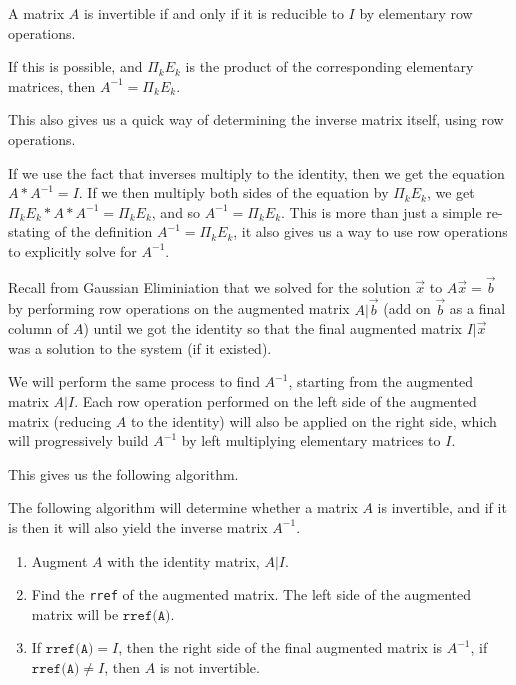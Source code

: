 \documentclass{ximera}
\begin{document}
\begin{theorem}\label{th:prod-elementary}
  A matrix $A$ is invertible if and
  only if it is reducible to $I$ by elementary row operations.

  If this is possible, and $\Pi_kE_k$ is the product of the corresponding elementary matrices, then $A^{-1}=\Pi_kE_k$.
\end{theorem}

This also gives us a quick way of determining the inverse matrix itself, using row operations.

\begin{remark}
  If we use the fact that inverses multiply to the identity, then we get the equation $A*A^{-1}=I$. If we then multiply both sides of the equation by $\Pi_kE_k$, we get $\Pi_kE_k*A*A^{-1}=\Pi_kE_k$, and so $A^{-1}=\Pi_kE_k$. This is more than just a simple re-stating of the definition $A^{-1}=\Pi_kE_k$, it also gives us a way to use row operations to explicitly solve for $A^{-1}$. 
  
  Recall from Gaussian Eliminiation that we solved for the solution $\vec{x}$ to $A\vec{x}=\vec{b}$ by performing row operations on the augmented matrix $A|\vec{b}$ (add on $\vec{b}$ as a final column of $A$) until we got the identity so that the final augmented matrix $I|\vec{x}$ was a solution to the system (if it existed).

  We will perform the same process to find $A^{-1}$, starting from the augmented matrix $A|I$. Each row operation performed on the left side of the augmented matrix (reducing $A$ to the identity) will also be applied on the right side, which will progressively build $A^{-1}$ by left multiplying elementary matrices to $I$.
\end{remark}

This gives us the following algorithm. 

\begin{theorem}
  The following algorithm will determine whether a matrix $A$ is invertible, and if it is then it will also yield the inverse matrix $A^{-1}$.
  \begin{enumerate}
    \item Augment $A$ with the identity matrix, $A|I$.
    \item Find the \texttt{rref} of the augmented matrix. The left side of the augmented matrix will be $\texttt{rref(A)}$.
    \item If $\texttt{rref(A)}=I$, then the right side of the final augmented matrix is $A^{-1}$, if $\texttt{rref(A)}\neq I$, then $A$ is not invertible.
  \end{enumerate}
\end{theorem}
\end{document}

